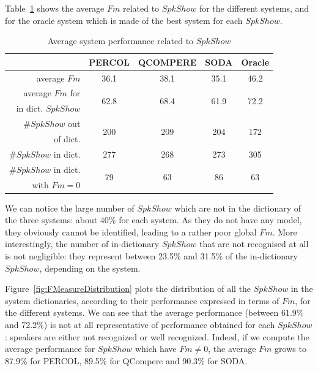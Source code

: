 Table~\ref{table-spkshow-perf} shows the average $Fm$ related to $SpkShow$ for the different systems, and for the oracle system which is made of the best system for each $SpkShow$.
\begin{table}[t]
\begin{center}
\footnotesize
\begin{tabular}{r||c|c|c|c}
						& PERCOL 				&	 QCOMPERE 			& SODA 					& Oracle 				\\
\hline\hline
average $Fm$ 			& 36.1 	 				& 38.1 					& 35.1 					& 46.2	 				\\
\hline
average $Fm$ for 		& \multirow{2}{*}{62.8}	& \multirow{2}{*}{68.4}	& \multirow{2}{*}{61.9}	& \multirow{2}{*}{72.2}	\\
in dict. $SpkShow$ 		&  						&  						&  						& 						\\
\hline
\#$SpkShow$ out 			& \multirow{2}{*}{200}	& \multirow{2}{*}{209}	& \multirow{2}{*}{204}	& \multirow{2}{*}{172}	\\
of dict. 				& 	 					& 	 					& 	 					& 						\\
\hline
\#$SpkShow$ in dict. 	& 277					& 268 					& 273 					& 305					\\
\hline
\#$SpkShow$ in dict. 	& \multirow{2}{*}{79}	& \multirow{2}{*}{63}	& \multirow{2}{*}{86} 	& \multirow{2}{*}{63}	\\
with $Fm=0$ 				& 	 					& 	 					& 	 					& 						\\
\hline
\end{tabular}
\caption{Average system performance related to $SpkShow$}
\label{table-spkshow-perf}
\end{center}
\end{table}
We can notice the large number of $SpkShow$ which are not in the dictionary of the three systems: about 40\% for each system. As they do not have any model, they obviously cannot be identified, leading to a rather poor global $Fm$. More interestingly, the number of in-dictionary $SpkShow$ that are not recognised at all is not negligible: they represent between 23.5\% and 31.5\% of the in-dictionary $SpkShow$, depending on the system.

Figure~\ref{fig:FMeasureDistribution} plots the distribution of all the $SpkShow$ in the system dictionaries, according to their performance expressed in terms of $Fm$, for the different systems. We can see that the average performance (between 61.9\% and 72.2\%) is not at all representative of performance obtained for each $SpkShow$: speakers are either not recognized or well recognized. Indeed, if we compute the average performance for $SpkShow$ which have $Fm \neq 0$, the average $Fm$ grows to 87.9\% for PERCOL, 89.5\% for QCompere and 90.3\% for SODA. 


